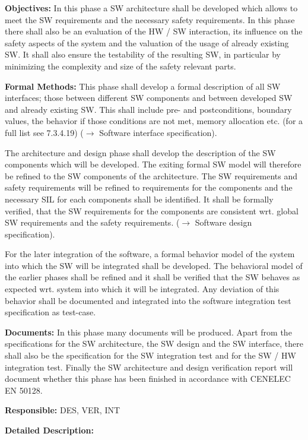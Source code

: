 {\bf Objectives:} In this phase a SW architecture shall be developed which
allows to meet the SW requirements and the necessary safety requirements. In
this phase there shall also be an evaluation of the HW / SW interaction, its
influence on the safety aspects of the system and the valuation of the usage of
already existing SW. It shall also ensure the testability of the resulting SW,
in particular by minimizing the complexity and size of the safety relevant
parts.

{\bf Formal Methods:} This phase shall develop a formal description of all SW
interfaces; those between different SW components and between developed SW and
already existing SW. This shall include pre- and postconditions, boundary
values, the behavior if those conditions are not met, memory allocation
etc. (for a full list see 7.3.4.19) ($\rightarrow$ Software interface
specification).

The architecture and design phase shall develop the description of the SW
components which will be developed. The exiting formal SW model will therefore
be refined to the SW components of the architecture. The SW requirements and
safety requirements will be refined to requirements for the components and the
necessary SIL for each components shall be identified. It shall be formally
verified, that the SW requirements for the components are consistent wrt. global
SW requirements and the safety requirements. ($\rightarrow$ Software design
specification).

For the later integration of the software, a formal behavior model of the system
into which the SW will be integrated shall be developed. The behavioral model of
the earlier phases shall be refined and it shall be verified that the SW behaves
as expected wrt. system into which it will be integrated. Any deviation of this
behavior shall be documented and integrated into the software integration
test specification as test-case.

{\bf Documents:} In this phase many documents will be produced. Apart from the
specifications for the SW architecture, the SW design and the SW interface,
there shall also be the specification for the SW integration test and for the SW
/ HW integration test. Finally the SW architecture and design verification
report will document whether this phase has been finished in accordance with
CENELEC EN 50128.

{\bf Responsible:} DES, VER, INT

{\bf Detailed Description:}

